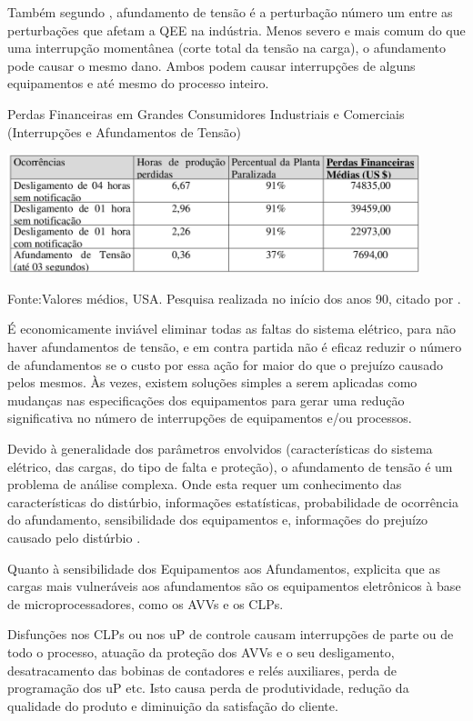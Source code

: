 \par
Também segundo \cite{ALV10}, afundamento de tensão é a perturbação número um entre as perturbações que afetam a QEE na indústria. Menos severo e mais comum do que uma interrupção momentânea (corte total da tensão na carga), o afundamento pode causar o mesmo dano. Ambos podem causar interrupções de alguns equipamentos e até mesmo do processo inteiro.
\begin{table}[!h]
\begin{center}
\caption{Perdas Financeiras em Grandes Consumidores Industriais e Comerciais (Interrupções e Afundamentos de Tensão)}
\includegraphics[width=12cm]{imagens/tab3_cap2.png}
\par{\small Fonte:Valores médios, USA. Pesquisa realizada no início dos anos 90, citado por \cite{ALV10}.}
\label{fig:tabperdas}
\end{center}
\end{table}
\par
É economicamente inviável eliminar todas as faltas do sistema elétrico, para não haver afundamentos de tensão, e em contra partida não é eficaz reduzir o número de afundamentos se o custo por essa ação for maior do que o prejuízo causado pelos mesmos.
Às vezes, existem soluções simples a serem aplicadas como mudanças nas especificações dos equipamentos para gerar uma redução significativa no número de interrupções de equipamentos e/ou processos.
\par
Devido à generalidade dos parâmetros envolvidos (características do sistema elétrico, das cargas, do tipo de falta e proteção), o afundamento de tensão é um problema de análise complexa. Onde esta requer um conhecimento das características do distúrbio, informações estatísticas, probabilidade de ocorrência do afundamento, sensibilidade dos equipamentos e, informações do prejuízo causado pelo distúrbio \citep{ALV10}.
\par
Quanto à sensibilidade dos Equipamentos aos Afundamentos, \cite{ALV10} explicita que as cargas mais vulneráveis aos afundamentos são os equipamentos eletrônicos à base de microprocessadores, como os \ac{AVVs} e os \ac{CLPs}.
\par
Disfunções nos \ac{CLPs} ou nos uP de controle causam interrupções de parte ou de todo o processo, atuação da proteção dos AVVs e o seu desligamento, desatracamento das bobinas de contadores e relés auxiliares, perda de programação dos uP etc. Isto causa perda de produtividade, redução da qualidade do produto e diminuição da satisfação do cliente.

